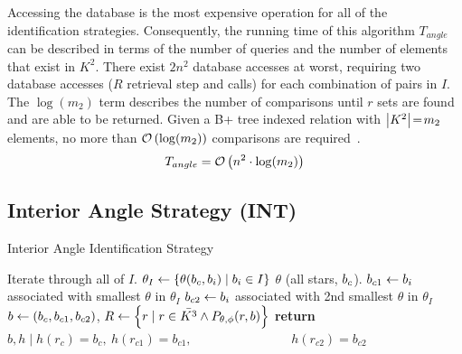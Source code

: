 Accessing the database is the most expensive operation for all of the identification strategies.
Consequently, the running time of this algorithm $T_{angle}$ can be described in terms of the number of queries and
the number of elements that exist in $K^2$.
There exist $2n^2$ database accesses at worst, requiring two database accesses ($R$ retrieval step and 
calls) for each combination of pairs in $I$.
The $\log (m_2)$ term describes the number of comparisons until $r$ sets are found and are able to be returned.
Given a B+ tree indexed relation with $\left| K^2 \right| \!=\! m_2$ elements, no more than $\mathcal{O} \left( \log(m_2) \right)$
comparisons are required~\cite{patel:advanceTreeStructures}.
\begin{equation}\label{eq:complexityAngle}
    T_{angle} = \bigO\left( n^2 \cdot \log(m_2) \right)
\end{equation}


\subsection{Interior Angle Strategy (INT)}\label{subsec:interiorAngleMethod}
\begin{algorithm}
    \caption{Interior Angle Identification Strategy} \label{algorithm:interiorAngleIdentification}
    \begin{algorithmic}[1]
          \Comment Iterate through all of $I$.
        \State $\theta_I \gets \{\theta(b_c, b_i) \mid b_i \in I\}$ \Comment $\theta$
        (all stars, $b_c$).
        \State $b_{c1} \gets b_i$ associated with smallest $\theta$ in $\theta_I$
        \State $b_{c2} \gets b_i$ associated with 2nd smallest $\theta$ in $\theta_I$
        \State $b \gets \left(b_c, b_{c1}, b_{c2}\right)$, $R \gets \left\{  r \mid r \in \bar{K^3} \land
        P_{\theta, \phi}(r, b)  \right\}$
        \State \textbf{return} $b, h \mid h(r_c) = b_{c}, \ h(r_{c1}) = b_{c1},$
        \State \ \ \ \ \ \ \ \ \ \ \ \ \ \ \  $h(r_{c2}) = b_{c2}$
        \EndIf
        \EndFor
        \EndFunction
    \end{algorithmic}
\end{algorithm}

